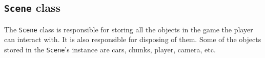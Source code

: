 \subsection{\texttt{Scene} class}
The \texttt{Scene} class is responsible for storing all the objects in the game the player can interact with.
It is also responsible for disposing of them.
Some of the objects stored in the \texttt{Scene}'s instance are cars, chunks, player, camera, etc.
